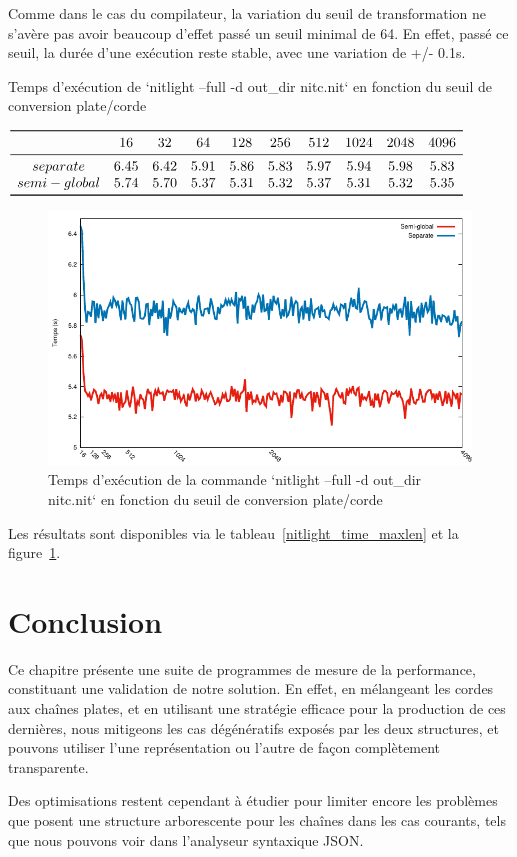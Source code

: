 Comme dans le cas du compilateur, la variation du seuil de transformation
ne s'avère pas avoir beaucoup d'effet passé un seuil minimal de 64.
En effet, passé ce seuil, la durée d'une exécution reste stable, avec une variation de +/- 0.1s.

\begin{table}
	\caption{\label{nitlight_time_maxlen}Temps d'exécution de `nitlight --full -d out\_dir nitc.nit` en fonction du seuil de conversion plate/corde}
	\centering
	$\begin{array}{ *{10}{c} }
		\toprule
		& 16 & 32 & 64 & 128 & 256 & 512 & 1024 & 2048 & 4096\\
		\midrule
		separate & 6.45 & 6.42 & 5.91 & 5.86 & 5.83 & 5.97 & 5.94 & 5.98 & 5.83\\
		semi-global & 5.74 & 5.70 & 5.37 & 5.31 & 5.32 & 5.37 & 5.31 & 5.32 & 5.35\\
		\bottomrule
	\end{array}$
\end{table}

\begin{figure}
	\caption{Temps d'exécution de la commande `nitlight --full -d out\_dir nitc.nit` en fonction du seuil de conversion plate/corde}
	\label{nitlight_sep_maxlen}
	\centering
	\includegraphics[]{figures/nitlight.pdf}
\end{figure}

Les résultats sont disponibles via le tableau~\ref{nitlight_time_maxlen} et la figure~\ref{nitlight_sep_maxlen}.

\section{Conclusion}

Ce chapitre présente une suite de programmes de mesure de la performance, constituant une validation de notre solution.
En effet, en mélangeant les cordes aux chaînes plates, et en utilisant une stratégie efficace pour la production de ces
dernières, nous mitigeons les cas dégénératifs exposés par les deux structures, et pouvons utiliser l'une représentation
ou l'autre de façon complètement transparente.

Des optimisations restent cependant à étudier pour limiter encore les problèmes que posent une
structure arborescente pour les chaînes dans les cas courants, tels que nous pouvons voir dans 
l'analyseur syntaxique JSON.
